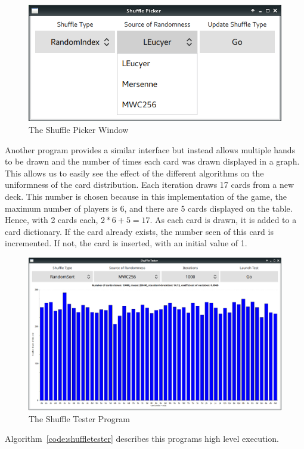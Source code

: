 \begin{figure}[H]
    \centering
    \includegraphics[width=0.8\linewidth]{../images/shufflepicker.png}
    \caption{The Shuffle Picker Window}%
    \label{fig:shufflepicker}
\end{figure}

Another program provides a similar interface but instead allows multiple hands 
to be drawn and the number of times each card was drawn displayed in a graph. 
This allows us to easily see the effect of the different algorithms on the 
uniformness of the card distribution. Each iteration draws 17 cards from
a new deck. This number is chosen because in this implementation of the game,
the maximum number of players is 6, and there are 5 cards displayed on the
table. Hence, with 2 cards each, $2 * 6 + 5 = 17$. As each card is drawn,
it is added to a card dictionary. If the card already exists, the number seen
of this card is incremented. If not, the card is inserted, with an initial
value of 1. 

\begin{figure}[H]
    \centering
    \includegraphics[width=0.8\linewidth]{../images/shuffletester.png}
    \caption{The Shuffle Tester Program}%
    \label{fig:shuffletester}
\end{figure}

Algorithm~\ref{code:shuffletester} describes this programs high
level execution.

